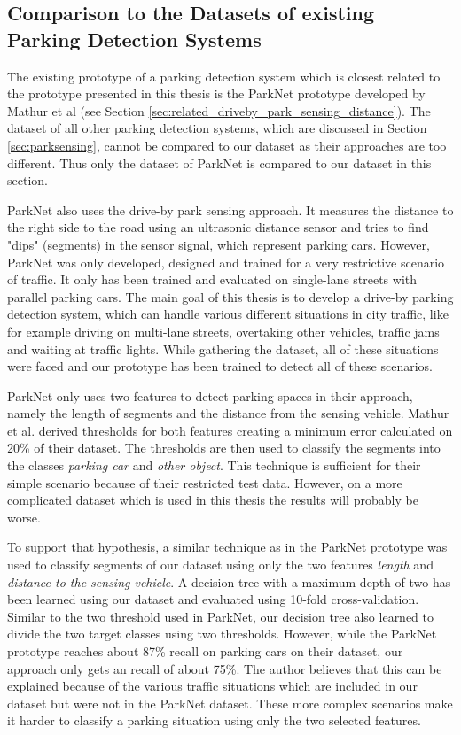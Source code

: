 \subsection{Comparison to the Datasets of existing Parking Detection Systems}

The existing prototype of a parking detection system which is closest related to the prototype presented in this thesis is the ParkNet prototype developed by Mathur et al \cite{Mathur:2010:PDS:1814433.1814448} (see Section \ref{sec:related_driveby_park_sensing_distance}). The dataset of all other parking detection systems, which are discussed in Section \ref{sec:parksensing}, cannot be compared to our dataset as their approaches are too different. Thus only the dataset of ParkNet is compared to our dataset in this section.

ParkNet also uses the drive-by park sensing approach. It measures the distance to the right side to the road using an ultrasonic distance sensor and tries to find "dips" (segments) in the sensor signal, which represent parking cars. However, ParkNet was only developed, designed and trained for a very restrictive scenario of traffic. It only has been trained and evaluated on single-lane streets with parallel parking cars. 
The main goal of this thesis is to develop a drive-by parking detection system, which can handle various different situations in city traffic, like for example driving on multi-lane streets, overtaking other vehicles, traffic jams and waiting at traffic lights. While gathering the dataset, all of these situations were faced and our prototype has been trained to detect all of these scenarios.

ParkNet only uses two features to detect parking spaces in their approach, namely the length of segments and the distance from the sensing vehicle. Mathur et al. derived thresholds for both features creating a minimum error calculated on 20\% of their dataset. The thresholds are then used to classify the segments into the classes \emph{parking car} and \emph{other object}. This technique is sufficient for their simple scenario because of their restricted test data. However, on a more complicated dataset which is used in this thesis the results will probably be worse.

To support that hypothesis, a similar technique as in the ParkNet prototype was used to classify segments of our dataset using only the two features \emph{length} and \emph{distance to the sensing vehicle}. A decision tree with a maximum depth of two has been learned using our dataset and evaluated using 10-fold cross-validation. Similar to the two threshold used in ParkNet, our decision tree also learned to divide the two target classes using two thresholds. However, while the ParkNet prototype reaches about 87\% recall on parking cars on their dataset, our approach only gets an recall of about 75\%. The author believes that this can be explained because of the various traffic situations which are included in our dataset but were not in the ParkNet dataset. These more complex scenarios make it harder to classify a parking situation using only the two selected features.


